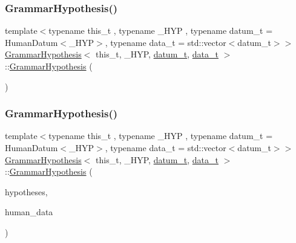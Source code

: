 \subsubsection{\texorpdfstring{Grammar\+Hypothesis()}{GrammarHypothesis()}\hspace{0.1cm}{\footnotesize\ttfamily [1/2]}}
{\footnotesize\ttfamily template$<$typename this\+\_\+t , typename \+\_\+\+H\+YP , typename datum\+\_\+t  = Human\+Datum$<$\+\_\+\+H\+Y\+P$>$, typename data\+\_\+t  = std\+::vector$<$datum\+\_\+t$>$$>$ \\
\hyperlink{class_grammar_hypothesis}{Grammar\+Hypothesis}$<$ this\+\_\+t, \+\_\+\+H\+YP, \hyperlink{class_bayesable_a9f1a6c0cd7855550fa10b1a8f13a5867}{datum\+\_\+t}, \hyperlink{class_bayesable_aa2788c4d7718c0a824e1d28c4c98f921}{data\+\_\+t} $>$\+::\hyperlink{class_grammar_hypothesis}{Grammar\+Hypothesis} (\begin{DoxyParamCaption}{ }\end{DoxyParamCaption})\hspace{0.3cm}{\ttfamily [inline]}}

\mbox{\label{class_grammar_hypothesis_af74bd80ebd8d4d1f2e16507826af5465}} 
\subsubsection{\texorpdfstring{Grammar\+Hypothesis()}{GrammarHypothesis()}\hspace{0.1cm}{\footnotesize\ttfamily [2/2]}}
{\footnotesize\ttfamily template$<$typename this\+\_\+t , typename \+\_\+\+H\+YP , typename datum\+\_\+t  = Human\+Datum$<$\+\_\+\+H\+Y\+P$>$, typename data\+\_\+t  = std\+::vector$<$datum\+\_\+t$>$$>$ \\
\hyperlink{class_grammar_hypothesis}{Grammar\+Hypothesis}$<$ this\+\_\+t, \+\_\+\+H\+YP, \hyperlink{class_bayesable_a9f1a6c0cd7855550fa10b1a8f13a5867}{datum\+\_\+t}, \hyperlink{class_bayesable_aa2788c4d7718c0a824e1d28c4c98f921}{data\+\_\+t} $>$\+::\hyperlink{class_grammar_hypothesis}{Grammar\+Hypothesis} (\begin{DoxyParamCaption}\item[{std\+::vector$<$ \hyperlink{class_grammar_hypothesis_a28fc99df28de741179719c94ecd77699}{H\+YP} $>$ \&}]{hypotheses,  }\item[{const \hyperlink{class_bayesable_aa2788c4d7718c0a824e1d28c4c98f921}{data\+\_\+t} $\ast$}]{human\+\_\+data }\end{DoxyParamCaption})\hspace{0.3cm}{\ttfamily [inline]}}



